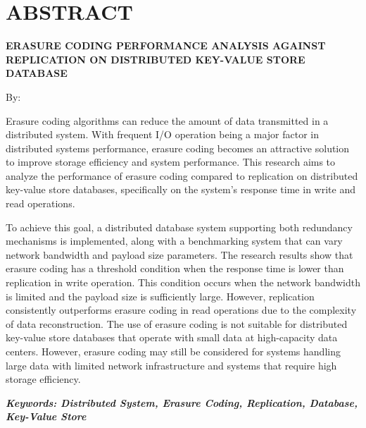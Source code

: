 \clearpage
\chapter*{ABSTRACT}

\begin{center}
  \center
  \begin{singlespace}
    \large\bfseries\MakeUppercase{Erasure Coding Performance Analysis Against Replication on Distributed Key-Value Store Database}
    
    \normalfont\normalsize
    By:
    
    \bfseries \theauthor
  \end{singlespace}
\end{center}


\begin{singlespace}
  \small
  Erasure coding algorithms can reduce the amount of data transmitted in a distributed system. With frequent I/O operation being a major factor in distributed systems performance, erasure coding becomes an attractive solution to improve storage efficiency and system performance. This research aims to analyze the performance of erasure coding compared to replication on distributed key-value store databases, specifically on the system's response time in write and read operations.

  To achieve this goal, a distributed database system supporting both redundancy mechanisms is implemented, along with a benchmarking system that can vary network bandwidth and payload size parameters. The research results show that erasure coding has a threshold condition when the response time is lower than replication in write operation. This condition occurs when the network bandwidth is limited and the payload size is sufficiently large. However, replication consistently outperforms erasure coding in read operations due to the complexity of data reconstruction. The use of erasure coding is not suitable for distributed key-value store databases that operate with small data at high-capacity data centers. However, erasure coding may still be considered for systems handling large data with limited network infrastructure and systems that require high storage efficiency.

  \textbf{\textit{Keywords: Distributed System, Erasure Coding, Replication, Database, Key-Value Store }}
\end{singlespace}
\clearpage

\clearpage